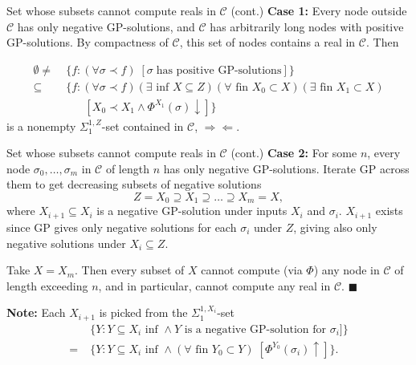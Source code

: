 \begin{frame}{Set whose subsets cannot compute reals in $\mathcal{C}$
(cont.)}
  \textbf{Case 1:} Every node outside $\mathcal{C}$ has only negative
  GP-solutions, and $\mathcal{C}$ has arbitrarily long nodes with
  positive GP-solutions. By compactness of $\mathcal{C}$, this set of
  nodes contains a real in $\mathcal{C}$. Then

  \pause
  \begin{align*}
    \emptyset\neq\; &\{f:(\forall \sigma\prec f)\; [\sigma\; \text{has
    positive GP-solutions}]\}\\
    \subseteq\; &\{f:(\forall \sigma\prec f) (\exists \text{ inf }
    X\subseteq Z) (\forall \text{ fin } X_0\subset X) (\exists \text{ fin }
    X_1\subset X)\\ &\;\;\;\;\;\;[X_0 \prec X_1 \wedge
    \Phi^{X_1}(\sigma)\downarrow]\}
  \end{align*}
  is a nonempty $\Sigma_1^{1,Z}$-set contained
  in $\mathcal{C}$, $\Rightarrow\Leftarrow$.
\end{frame}

\begin{frame}{Set whose subsets cannot compute reals in $\mathcal{C}$
(cont.)}
  \textbf{Case 2:} For some $n$, every node $\sigma_0,\ldots,\sigma_m$ in
  $\mathcal{C}$ of length $n$ has only negative GP-solutions. Iterate GP
  across them to get decreasing subsets of negative solutions
  \[Z=X_0 \supseteq X_1 \supseteq \ldots\supseteq X_m=X,\]
  where $X_{i+1}\subseteq X_i$ is a negative GP-solution under inputs
  $X_i$ and $\sigma_i$. $X_{i+1}$ exists since GP gives only negative
  solutions for each $\sigma_i$ under $Z$, giving also only negative
  solutions under $X_i\subseteq Z$.

  \pause
  \vspace{0.5em}
  Take $X=X_m$. Then every subset of $X$ cannot compute (via $\Phi$) any
  node in $\mathcal{C}$ of length exceeding $n$, and in particular,
  cannot compute any real in $\mathcal{C}$. $\blacksquare$

  \pause
  \vspace{0.5em}
  \textbf{Note:} Each $X_{i+1}$ is picked from the $\Sigma^{1,X_i}_1$-set
  \begin{align*}
    &\{Y:Y\subseteq X_i \text{ inf } \wedge Y \text{ is a
    negative GP-solution for } \sigma_i]\}\\
    =\;&\{Y:Y\subseteq X_i \text{ inf } \wedge (\forall \text{ fin }
    Y_0\subset Y)\; [\Phi^{Y_0}(\sigma_i)\uparrow]\}.
  \end{align*}
\end{frame}

